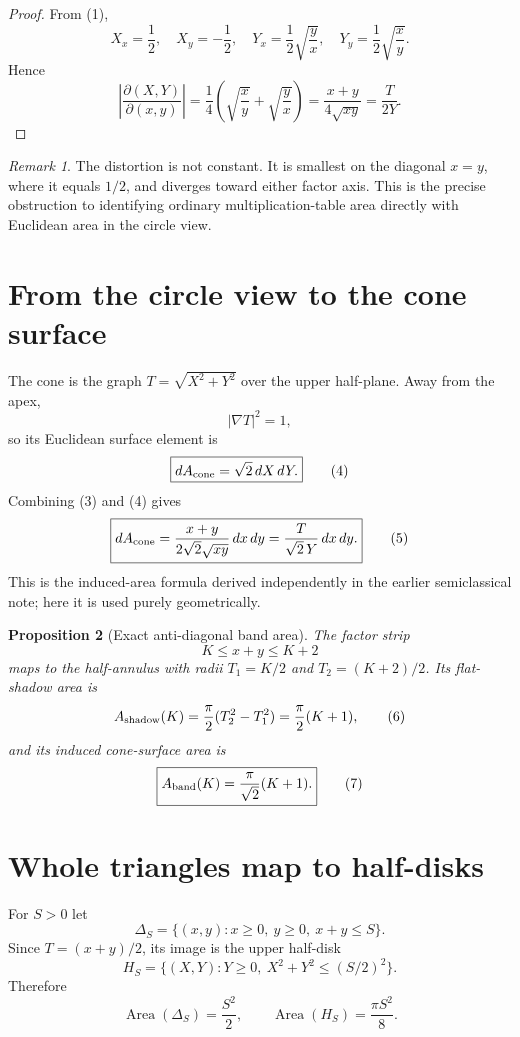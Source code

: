 \documentclass[11pt]{amsart}
\newtheorem{proposition}{Proposition}
\theoremstyle{remark}
\newtheorem{remark}[proposition]{Remark}
\begin{document}
\begin{proof}
From (1),
\[
X_x=\frac12,\quad X_y=-\frac12,\quad
Y_x=\frac12\sqrt{\frac yx},\quad
Y_y=\frac12\sqrt{\frac xy}.
\]
Hence
\[
\left|\frac{\partial(X,Y)}{\partial(x,y)}\right|
=\frac14\left(\sqrt{\frac xy}+\sqrt{\frac yx}\right)
=\frac{x+y}{4\sqrt{xy}}
=\frac{T}{2Y}.
\]
\end{proof}

\begin{remark}
The distortion is not constant.  It is smallest on the diagonal $x=y$, where it equals $1/2$, and diverges toward either factor axis.  This is the precise obstruction to identifying ordinary multiplication-table area directly with Euclidean area in the circle view.
\end{remark}

\section{From the circle view to the cone surface}
The cone is the graph $T=\sqrt{X^2+Y^2}$ over the upper half-plane.  Away from the apex,
\[
\left|\nabla T\right|^2=1,
\]
so its Euclidean surface element is
\begin{equation}
\boxed{dA_{\rm cone}=\sqrt2\,dX\,dY.}\tag{4}
\end{equation}
Combining (3) and (4) gives
\begin{equation}
\boxed{
 dA_{\rm cone}=\frac{x+y}{2\sqrt2\sqrt{xy}}\,dx\,dy
 =\frac{T}{\sqrt2\,Y}\,dx\,dy.}
\tag{5}
\end{equation}
This is the induced-area formula derived independently in the earlier semiclassical note; here it is used purely geometrically.

\begin{proposition}[Exact anti-diagonal band area]\label{prop:band}
The factor strip
\[
K\le x+y\le K+2
\]
maps to the half-annulus with radii $T_1=K/2$ and $T_2=(K+2)/2$.  Its flat-shadow area is
\begin{equation}
A_{\rm shadow}(K)=\frac\pi2(T_2^2-T_1^2)=\frac\pi2(K+1), \tag{6}
\end{equation}
and its induced cone-surface area is
\begin{equation}
\boxed{A_{\rm band}(K)=\frac\pi{\sqrt2}(K+1).}\tag{7}
\end{equation}
\end{proposition}

\section{Whole triangles map to half-disks}
For $S>0$ let
\[
\Delta_S=\{(x,y):x\ge0,\ y\ge0,\ x+y\le S\}.
\]
Since $T=(x+y)/2$, its image is the upper half-disk
\[
H_S=\{(X,Y):Y\ge0,\ X^2+Y^2\le(S/2)^2\}.
\]
Therefore
\[
\operatorname{Area}(\Delta_S)=\frac{S^2}{2},
\qquad
\operatorname{Area}(H_S)=\frac{\pi S^2}{8}.
\]
\end{document}
